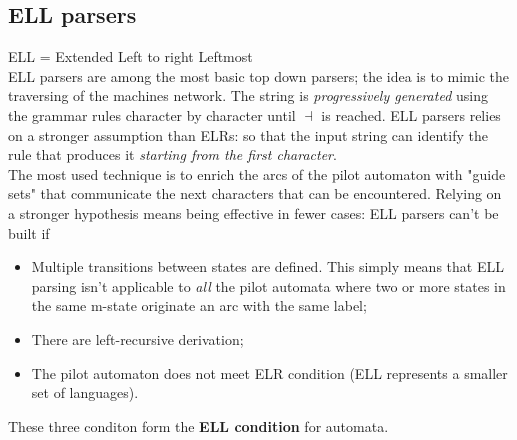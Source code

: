 		\subsection{ELL parsers}
			ELL = Extended Left to right Leftmost\\
			ELL parsers are among the most basic top down parsers; the idea is to mimic the traversing of the machines network. The string is \emph{progressively generated} using the grammar rules character by character until $\dashv$ is reached. ELL parsers relies on a stronger assumption than ELRs: so that the input string can identify the rule that produces it \emph{starting from the first character}.\\
			The most used technique is to enrich the arcs of the pilot automaton with "guide sets" that communicate the next characters that can be encountered. Relying on a stronger hypothesis means being effective in fewer cases: ELL parsers can't be built if
			\begin{itemize}
				\item Multiple transitions between states are defined. This simply means that ELL parsing isn't applicable to \emph{all} the pilot automata where two or more states in the same m-state originate an arc with the same label;
				\item There are left-recursive derivation;
				\item The pilot automaton does not meet ELR condition (ELL represents a smaller set of languages). 
			\end{itemize}
			These three conditon form the \textbf{ELL condition} for automata.
			
